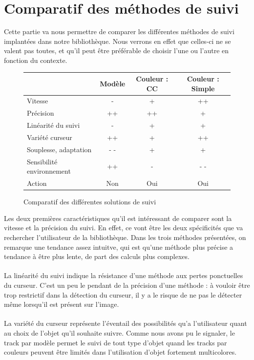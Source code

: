 \documentclass{report}
\begin{document}
		\section{Comparatif des méthodes de suivi}
		Cette partie va nous permettre de comparer les différentes méthodes de suivi implantées dans notre bibliothèque. Nous verrons en effet que celles-ci ne se valent pas toutes, et qu'il peut être préférable de choisir l'une ou l'autre en fonction du contexte.
				        \begin{figure}[h]
				\Large{
				\begin{center}
				\begin{tabular}{|l|c|c|c|}
				\hline
				\backslashbox{Caractéristique}{\quad Méthode}& Modèle  &Couleur : CC & Couleur : Simple  \\
				\hline
				Vitesse & -& + & ++ \\
				\hline
				Précision &++&++&+\\
				\hline
				Linéarité du suivi&-&+&+\\
				\hline
				Variété curseur &++&+&++\\
				\hline
				Souplesse, adaptation & - - & + &+\\
				\hline
				Sensibilité environnement &++&-&- -\\
				\hline
				Action &Non & Oui & Oui \\
				\hline
				\end{tabular}
				\end{center}
				\caption{Comparatif des différentes solutions de suivi}
				\label{tableau comparatif}}
				\end{figure}
				
			Les deux premières caractéristiques qu'il est intéressant de comparer sont la vitesse et la précision du suivi. En effet, ce vont être les deux spécificités que va rechercher l'utilisateur de la bibliothèque. Dans les trois méthodes présentées, on remarque une tendance assez intuitve, qui est qu'une méthode plus précise a tendance à être plus lente, de part des calculs plus complexes.
			\paragraph{}
			La linéarité du suivi indique la résistance d'une méthode aux pertes ponctuelles du curseur. C'est un peu le pendant de la précision d'une méthode : à vouloir être trop restrictif dans la détection du curseur, il y a le risque de ne pas le détecter même lorsqu'il est présent sur l'image.
			\paragraph{}
			La variété du curseur représente l'éventail des possibilités qu'a l'utilisateur quant au choix de l'objet qu'il souhaite suivre. Comme nous avons pu le signaler, le track par modèle permet le suivi de tout type d'objet quand les tracks par couleurs peuvent être limités dans l'utilisation d'objet fortement multicolores.
\end{document}
